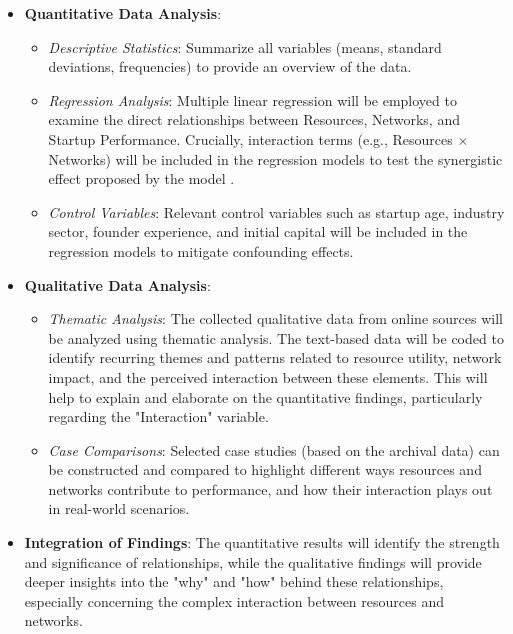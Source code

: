 \documentclass[../Main.tex]{subfiles}
\begin{document}
\begin{itemize}
    \item \textbf{Quantitative Data Analysis}:
          \begin{itemize}
              \item \textit{Descriptive Statistics}: Summarize all variables (means, standard deviations, frequencies) to provide an overview of the data.
              \item \textit{Regression Analysis}: Multiple linear regression will be employed to examine the direct relationships between Resources, Networks, and Startup Performance. Crucially, interaction terms (e.g., Resources $\times$ Networks) will be included in the regression models to test the synergistic effect proposed by the model \cite{al2017challenges}.
              \item \textit{Control Variables}: Relevant control variables such as startup age, industry sector, founder experience, and initial capital will be included in the regression models to mitigate confounding effects.
          \end{itemize}
    \item \textbf{Qualitative Data Analysis}:
          \begin{itemize}
              \item \textit{Thematic Analysis}: The collected qualitative data from online sources will be analyzed using thematic analysis. The text-based data will be coded to identify recurring themes and patterns related to resource utility, network impact, and the perceived interaction between these elements. This will help to explain and elaborate on the quantitative findings, particularly regarding the "Interaction" variable.
              \item \textit{Case Comparisons}: Selected case studies (based on the archival data) can be constructed and compared to highlight different ways resources and networks contribute to performance, and how their interaction plays out in real-world scenarios.
          \end{itemize}
    \item \textbf{Integration of Findings}: The quantitative results will identify the strength and significance of relationships, while the qualitative findings will provide deeper insights into the "why" and "how" behind these relationships, especially concerning the complex interaction between resources and networks.
\end{itemize}
\end{document}
